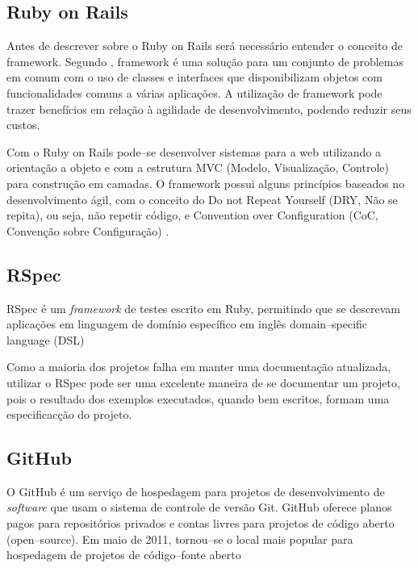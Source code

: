 \subsection{Ruby on Rails}

Antes de descrever sobre o Ruby on Rails ser\'a necess\'ario entender o conceito de framework. Segundo \cite{hartl2012ruby}, framework \'e uma solu\c{c}\~ao para um conjunto de problemas em comum com o uso de classes e interfaces que disponibilizam objetos com funcionalidades comuns a v\'arias aplica\c{c}\~oes. A utiliza\c{c}\~ao de framework pode trazer benef\'icios em rela\c{c}\~ao \`a agilidade de desenvolvimento, podendo reduzir seus custos.

Com o Ruby on Rails pode--se desenvolver sistemas para a web utilizando a orienta\c{c}\~ao a objeto e com a estrutura MVC (Modelo, Visualiza\c{c}\~ao, Controle) para constru\c{c}\~ao em camadas. O framework possui alguns princ\'ipios baseados no desenvolvimento \'agil, com o conceito do Do not Repeat Yourself (DRY, N\~ao se repita), ou seja, n\~ao repetir c\'odigo, e Convention over Configuration (CoC, Conven\c{c}\~ao sobre Configura\c{c}\~ao) \cite{akita2006repensando}.

\subsection{RSpec}

RSpec \'e um \emph{framework} de testes escrito em Ruby, permitindo que se descrevam aplica\c{c}\~oes em linguagem de dom\'inio espec\'ifico em ingl\^es domain--specific language (DSL) \cite{chelimsky2010rspec}

Como a maioria dos projetos falha em manter uma documenta\c{c}\~ao atualizada, utilizar o RSpec pode ser uma excelente maneira de se documentar um projeto, pois o resultado dos exemplos executados, quando bem escritos, formam uma especificac\c{c}\~ao do projeto.

\subsection{GitHub}

O GitHub \'e um servi\c{c}o de hospedagem para projetos de desenvolvimento de \emph{software} que usam o sistema de controle de vers\~ao Git. GitHub oferece planos pagos para reposit\'orios privados e contas livres para projetos de c\'odigo aberto (open--source). Em maio de 2011, tornou--se o local mais popular para hospedagem de projetos de c\'odigo--fonte aberto \cite{loeliger2012version}

